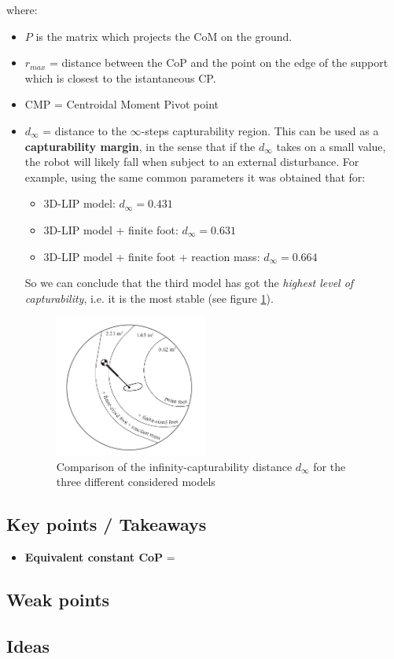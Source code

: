where:
\begin{itemize}
\item $P$ is the matrix which projects the CoM on the ground.
\item $r_{max}$ = distance between the CoP and the point on the edge of the support which is closest to the istantaneous CP.
\item CMP = Centroidal Moment Pivot point
\item $d_{\infty}$ = distance to the $\infty$-steps capturability region. This can be used as a \textbf{capturability margin}, in the sense that if the $d_{\infty}$ takes on a small value, the robot will likely fall when subject to an external disturbance. For example, using the same common parameters it was obtained that for:
\begin{itemize}
\item 3D-LIP model: $d_{\infty} = 0.431$
\item 3D-LIP model + finite foot: $d_{\infty} = 0.631$
\item 3D-LIP model + finite foot + reaction mass: $d_{\infty} = 0.664$
\end{itemize}
So we can conclude that the third model has got the \textit{highest level of capturability}, i.e. it is the most stable (see figure \ref{InftyCap}).
\\
\begin{figure}
  \centering
  \includegraphics[width=50mm]{InftyCapturability.png}
  \caption{Comparison of the infinity-capturability distance $d_{\infty}$ for the three different considered models}
  \label{InftyCap}
\end{figure}
\end{itemize}
\subsection*{Key points / Takeaways}
\begin{itemize}
\item \textbf{Equivalent constant CoP} =
\end{itemize}
\subsection*{Weak points}
\subsection*{Ideas}

